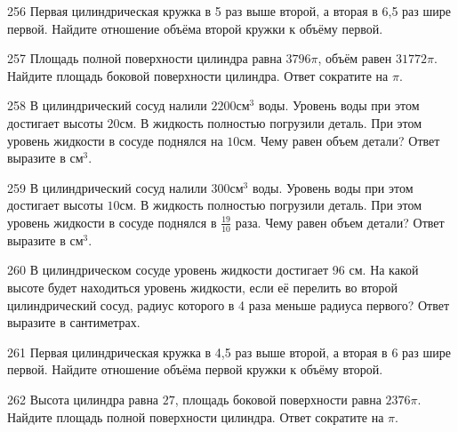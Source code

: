 \documentclass[4apaper]{article}
\begin{document}
\begin{taskBN}{256}
 Первая цилиндрическая кружка в 5 раз выше второй, а вторая в 6,5 раз шире первой. Найдите отношение объёма второй кружки к объёму первой.
\end{taskBN}

\begin{taskBN}{257}
Площадь полной поверхности цилиндра равна $3796\pi$, объём равен $31772\pi$. Найдите площадь боковой поверхности цилиндра. Ответ сократите на $\pi$.
\end{taskBN}

\begin{taskBN}{258}
В цилиндрический сосуд налили $2200\mbox{см}^3$ воды. Уровень воды при этом достигает высоты $20$см. В жидкость полностью погрузили деталь. При этом уровень жидкости в сосуде поднялся на $10$см. Чему равен объем детали? Ответ выразите в $\mbox{см}^3$.
\end{taskBN}

\begin{taskBN}{259}
В цилиндрический сосуд налили $300\mbox{см}^3$ воды. Уровень воды при этом достигает высоты $10$см. В жидкость полностью погрузили деталь. При этом уровень жидкости в сосуде поднялся в $\frac{19}{10}$ раза. Чему равен объем детали? Ответ выразите в $\mbox{см}^3$.
\end{taskBN}

\begin{taskBN}{260}
В цилиндрическом сосуде уровень жидкости достигает 96 см. На какой высоте будет находиться уровень жидкости, если её перелить во второй цилиндрический сосуд, радиус которого в 4 раза меньше радиуса первого? Ответ выразите в сантиметрах.
\end{taskBN}

\begin{taskBN}{261}
 Первая цилиндрическая кружка в 4,5 раз выше второй, а вторая в 6 раз шире первой. Найдите отношение объёма первой кружки к объёму второй.
\end{taskBN}

\begin{taskBN}{262}
Высота цилиндра равна $27$, площадь боковой поверхности равна $2376\pi$. Найдите площадь полной поверхности цилиндра. Ответ сократите на $\pi$.
\end{taskBN}
\end{document}
